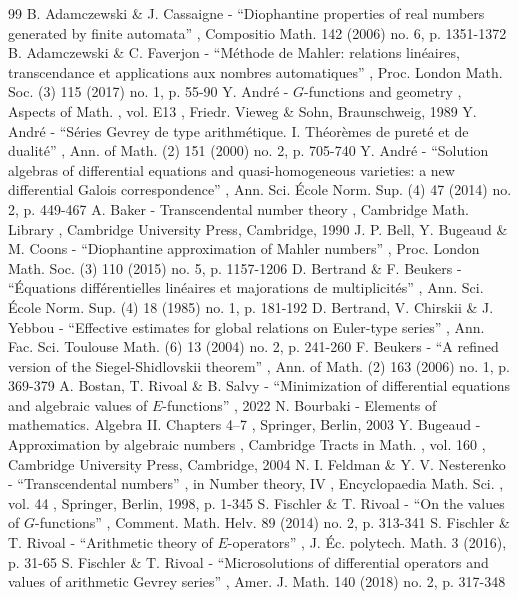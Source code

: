 \documentclass[11pt]{article}
\numberwithin{equation}{section}
\theoremstyle{definition}
\begin{document}
\begin{thebibliography}{99}
 B. Adamczewski \& J. Cassaigne - “Diophantine properties of real numbers generated by finite automata” , Compositio Math. 142 (2006) no. 6, p. 1351-1372
 B. Adamczewski \& C. Faverjon - “Méthode de Mahler: relations linéaires, transcendance et applications aux nombres automatiques” , Proc. London Math. Soc. (3) 115 (2017) no. 1, p. 55-90
 Y. André - $G$-functions and geometry , Aspects of Math. , vol. E13 , Friedr. Vieweg \& Sohn, Braunschweig, 1989
 Y. André - “Séries Gevrey de type arithmétique. I. Théorèmes de pureté et de dualité” , Ann. of Math. (2) 151 (2000) no. 2, p. 705-740
 Y. André - “Solution algebras of differential equations and quasi-homogeneous varieties: a new differential Galois correspondence” , Ann. Sci. École Norm. Sup. (4) 47 (2014) no. 2, p. 449-467
 A. Baker - Transcendental number theory , Cambridge Math. Library , Cambridge University Press, Cambridge, 1990
 J. P. Bell, Y. Bugeaud \& M. Coons - “Diophantine approximation of Mahler numbers” , Proc. London Math. Soc. (3) 110 (2015) no. 5, p. 1157-1206
 D. Bertrand \& F. Beukers - “Équations différentielles linéaires et majorations de multiplicités” , Ann. Sci. École Norm. Sup. (4) 18 (1985) no. 1, p. 181-192
 D. Bertrand, V. Chirskii \& J. Yebbou - “Effective estimates for global relations on Euler-type series” , Ann. Fac. Sci. Toulouse Math. (6) 13 (2004) no. 2, p. 241-260
 F. Beukers - “A refined version of the Siegel-Shidlovskii theorem” , Ann. of Math. (2) 163 (2006) no. 1, p. 369-379
 A. Bostan, T. Rivoal \& B. Salvy - “Minimization of differential equations and algebraic values of $E$-functions” , 2022
 N. Bourbaki - Elements of mathematics. Algebra II. Chapters 4–7 , Springer, Berlin, 2003
 Y. Bugeaud - Approximation by algebraic numbers , Cambridge Tracts in Math. , vol. 160 , Cambridge University Press, Cambridge, 2004
 N. I. Feldman \& Y. V. Nesterenko - “Transcendental numbers” , in Number theory, IV , Encyclopaedia Math. Sci. , vol. 44 , Springer, Berlin, 1998, p. 1-345
 S. Fischler \& T. Rivoal - “On the values of $G$-functions” , Comment. Math. Helv. 89 (2014) no. 2, p. 313-341
 S. Fischler \& T. Rivoal - “Arithmetic theory of $E$-operators” , J. Éc. polytech. Math. 3 (2016), p. 31-65
 S. Fischler \& T. Rivoal - “Microsolutions of differential operators and values of arithmetic Gevrey series” , Amer. J. Math. 140 (2018) no. 2, p. 317-348

\end{thebibliography}
\end{document}
